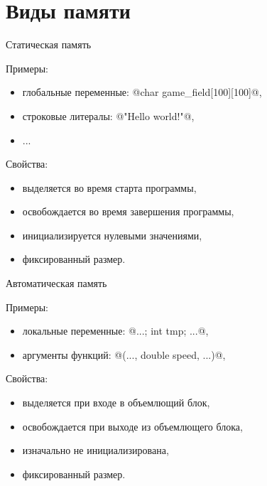 \section{Виды памяти}

\begin{frame}[fragile]{Статическая память}

  Примеры:
  \begin{itemize}
    \item глобальные переменные: @char game_field[100][100]@,
    \item строковые литералы: @"Hello world!"@,
    \item ...
  \end{itemize}

  \pause
  Свойства:
  \begin{itemize}
    \item выделяется во время старта программы,
    \item освобождается во время завершения программы,
    \item инициализируется нулевыми значениями,
    \item фиксированный размер.
  \end{itemize}

\end{frame}

\begin{frame}[fragile]{Автоматическая память}

  Примеры:
  \begin{itemize}
    \item локальные переменные: @{...; int tmp; ...}@,
    \item аргументы функций: @(..., double speed, ...)@,
  \end{itemize}

  \pause
  Свойства:
  \begin{itemize}
    \item выделяется при входе в объемлющий блок,
    \item освобождается при выходе из объемлющего блока,
    \item изначально не инициализирована,
    \item фиксированный размер.
  \end{itemize}

\end{frame}

